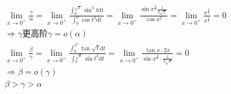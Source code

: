 \documentclass[cn,cyan,fleqn]{elegantbook}
\begin{document}
\begin{solution}
\begin{equation*}
  \begin{aligned}
  &\lim\limits_{x\to 0^+}\frac{\gamma}{\alpha}=\lim\limits_{x\to 0^+}\frac{\int_{0}^{\sqrt{x}}\sin^3 t\text{d}t}{\int_{0}^{x}\cos t^2\text{d}t}=\lim\limits_{x\to 0^+}\frac{\sin x^\frac{2}{3}\frac{1}{2\sqrt{x}}}{\cos x^2}=\lim\limits_{x\to 0^+}\frac{x^\frac{3}{2}}{x^\frac{1}{2}}=0\\
  &\Rightarrow\gamma\mbox{更高阶}\gamma=o(\alpha)\\
  &\lim\limits_{x\to 0^+}\frac{\beta}{\gamma}=\lim\limits_{x\to 0^+}\frac{\int_{0}^{x^2}\tan \sqrt{t}\mbox{d}t}{\int_{0}^{\sqrt{x}}\sin t^3\text{d}t}=\lim\limits_{x\to 0^+}\frac{\tan x\cdot 2x}{\sin x^\frac{3}{2}\cdot\frac{1}{2\sqrt{x}}}=0\\
  &\Rightarrow\beta=o(\gamma)\\
  &\beta>\gamma>\alpha
  \end{aligned}
\end{equation*}
\end{solution}
\end{document}
